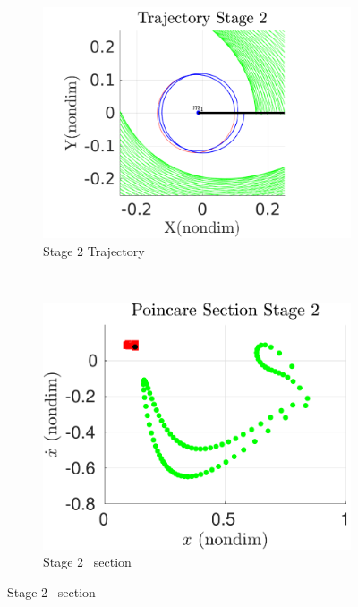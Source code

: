 \begin{figure}[htbp]
    \begin{subfigure}[htbp]{0.5\textwidth} 
        \includegraphics[width=\textwidth, keepaspectratio]{figures/2017_JAS/stage2_trajectory_zoom.pdf} 
        \caption{Stage 2 Trajectory~\label{fig:stage2_trajecotry_zoom}} 
    \end{subfigure}~
    \begin{subfigure}[htbp]{0.5\textwidth} 
        \includegraphics[width=\textwidth, keepaspectratio]{figures/2017_JAS/stage2_poincare.pdf} 
        \caption{Stage 2 \Poincare~section \label{fig:stage2_poincare}} 
    \end{subfigure}


\end{figure}
